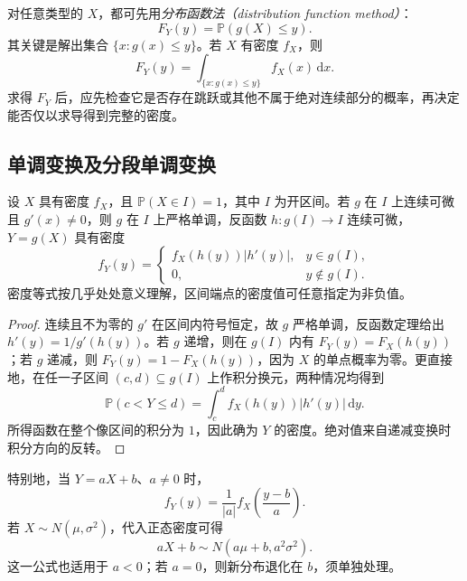 对任意类型的 $X$，都可先用\emph{分布函数法（distribution function method）}：
\begin{equation}
  F_Y(y)=\mathbb P(g(X)\le y).
  \label{eq:study-general-transformation-cdf}
\end{equation}
其关键是解出集合 $\{x:g(x)\le y\}$。若 $X$ 有密度 $f_X$，则
\begin{equation}
  F_Y(y)=\int_{\{x:g(x)\le y\}}f_X(x)\,\mathrm dx.
  \label{eq:study-continuous-transformation-cdf}
\end{equation}
求得 $F_Y$ 后，应先检查它是否存在跳跃或其他不属于绝对连续部分的概率，再决定能否仅以求导得到完整的密度。

\subsection{单调变换及分段单调变换}
\label{subsec:study-density-transformation}

\begin{theorem}[单调变换的密度公式]
\label{thm:study-monotone-density-transformation}
设 $X$ 具有密度 $f_X$，且 $\mathbb P(X\in I)=1$，其中 $I$ 为开区间。若 $g$ 在 $I$ 上连续可微且 $g'(x)\ne0$，则 $g$ 在 $I$ 上严格单调，反函数 $h:g(I)\to I$ 连续可微，$Y=g(X)$ 具有密度
\begin{equation}
  f_Y(y)=\begin{cases}
    f_X(h(y))|h'(y)|,&y\in g(I),\\
    0,&y\notin g(I).
  \end{cases}
  \label{eq:study-monotone-density-transformation}
\end{equation}
密度等式按几乎处处意义理解，区间端点的密度值可任意指定为非负值。
\end{theorem}

\begin{proof}
连续且不为零的 $g'$ 在区间内符号恒定，故 $g$ 严格单调，反函数定理给出 $h'(y)=1/g'(h(y))$。若 $g$ 递增，则在 $g(I)$ 内有 $F_Y(y)=F_X(h(y))$；若 $g$ 递减，则 $F_Y(y)=1-F_X(h(y))$，因为 $X$ 的单点概率为零。更直接地，在任一子区间 $(c,d)\subseteq g(I)$ 上作积分换元，两种情况均得到
\[
  \mathbb P(c<Y\le d)=\int_c^df_X(h(y))|h'(y)|\,\mathrm dy.
\]
所得函数在整个像区间的积分为 $1$，因此确为 $Y$ 的密度。绝对值来自递减变换时积分方向的反转。
\end{proof}

特别地，当 $Y=aX+b$、$a\ne0$ 时，
\begin{equation}
  f_Y(y)=\frac1{|a|}f_X\left(\frac{y-b}{a}\right).
  \label{eq:study-affine-density}
\end{equation}
若 $X\sim N(\mu,\sigma^2)$，代入正态密度可得
\begin{equation}
  aX+b\sim N(a\mu+b,a^2\sigma^2).
  \label{eq:study-affine-normal}
\end{equation}
这一公式也适用于 $a<0$；若 $a=0$，则新分布退化在 $b$，须单独处理。

